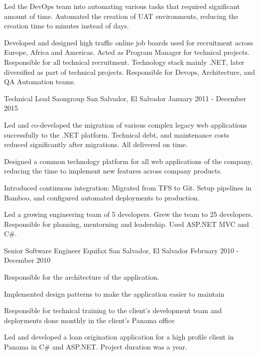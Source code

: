 \begin{cventries}
{\begin{cvitems}
        \item {Led the DevOps team into automating various tasks that required significant amount of time. Automated the creation of UAT environments, reducing the creation time to minutes instead of days.}
      \end{cvitems}
    }
    {
      \begin{cventrysummary} %
        Developed and designed high traffic online job boards used for recruitment across Europe, Africa and Americas. Acted as Program Manager for technical projects. Responsible for all technical recruitment. Technology stack mainly .NET, later diversified as part of technical projects. Responsible for Devops, Architecture, and QA Automation teams.
      \end{cventrysummary}
    }

  \cventry
    {Technical Lead} %
    {Saongroup}
    {San Salvador, El Salvador}
    {January 2011 - December 2015} %
    {
      \begin{cvitems}
        \item {Led and co-developed the migration of various complex legacy web applications successfully to the .NET platform. Technical debt, and maintenance costs reduced significantly after migrations. All delivered on time.}
        \item {Designed a common technology platform for all web applications of the company, reducing the time to implement new features across company products.}
        \item {Introduced continuous integration: Migrated from TFS to Git. Setup pipelines in Bamboo, and configured automated deployments to production.}
      \end{cvitems}
    }
    {Led a growing engineering team of 5 developers. Grew the team to 25 developers. Responsible for planning, mentorning and leadership. Used ASP.NET MVC and C\#.}

  \cventry
    {Senior Software Engineer} %
    {Equifax} %
    {San Salvador, El Salvador} %
    {February 2010 - December 2010} %
    {
      \begin{cvitems} %
        \item {Responsible for the architecture of the application.}
        \item {Implemented design patterns to make the application easier to maintain}
        \item {Responsible for technical training to the client’s development team and deployments done monthly in the client’s Panama office}
      \end{cvitems}
    }
    {Led and developed a loan origination application for a high profile client in Panama in C\# and ASP.NET. Project duration was a year.}


\end{cventries}
